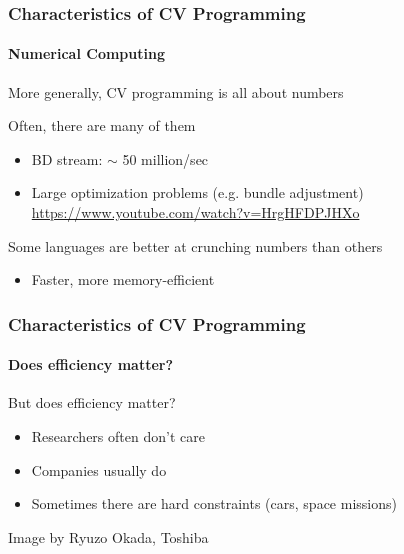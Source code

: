 \documentclass[xetex,professionalfont]{beamer}
\newcommand{\eg}{\mbox{e.g.}\xspace} %
\begin{document}
\begin{frame}
\frametitle{Characteristics of CV Programming}
\framesubtitle{Numerical Computing}

More generally, CV programming is all about numbers

\bigskip
Often, there are many of them
\begin{itemize}
	\item BD stream: $\sim$ 50 million/sec %
	\item Large optimization problems (\eg bundle adjustment) \\ \url{https://www.youtube.com/watch?v=HrgHFDPJHXo}
\end{itemize}

\bigskip
Some languages are better at crunching numbers than others
\begin{itemize}
	\item Faster, more memory-efficient
\end{itemize}

\end{frame}


\begin{frame}
\frametitle{Characteristics of CV Programming}
\framesubtitle{Does efficiency matter?}

But does efficiency matter?
\begin{itemize}
	\item Researchers often don't care
	\item Companies usually do %
	\item Sometimes there are hard constraints (cars, space missions)
\end{itemize}

\medskip
\begin{center}
	{\centering Image by Ryuzo Okada, Toshiba}
\end{center}

\end{frame}

\end{document}
